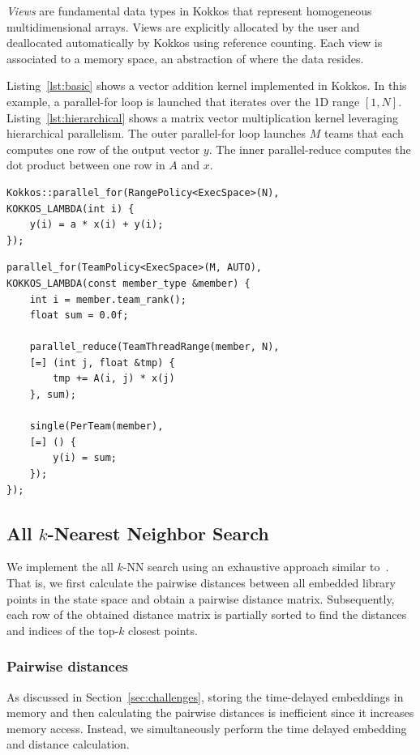 \documentclass{acmart}
\begin{document}
\textit{Views} are fundamental data types in Kokkos that represent
homogeneous multidimensional arrays. Views are explicitly allocated by the
user and deallocated automatically by Kokkos using reference counting. Each
view is associated to a memory space, an abstraction of where the data
resides.

Listing~\ref{lst:basic} shows a vector addition  kernel implemented in Kokkos.
In this example, a parallel-for loop is launched that iterates over the 1D
range $[1,N]$.
Listing~\ref{lst:hierarchical} shows a matrix vector multiplication kernel
leveraging hierarchical parallelism. The outer parallel-for loop launches $M$ teams
that each computes one row of the output vector $y$. The inner parallel-reduce
computes the dot product between one row in $A$ and $x$.

\begin{lstlisting}[caption={Basic data parallel loop},label={lst:basic},float]
Kokkos::parallel_for(RangePolicy<ExecSpace>(N),
KOKKOS_LAMBDA(int i) {
    y(i) = a * x(i) + y(i);
});
\end{lstlisting}

\begin{lstlisting}[caption={Hierarchical data parallel loop},label={lst:hierarchical},float]
parallel_for(TeamPolicy<ExecSpace>(M, AUTO),
KOKKOS_LAMBDA(const member_type &member) {
    int i = member.team_rank();
    float sum = 0.0f;

    parallel_reduce(TeamThreadRange(member, N),
    [=] (int j, float &tmp) {
        tmp += A(i, j) * x(j)
    }, sum);

    single(PerTeam(member),
    [=] () {
        y(i) = sum;
    });
});
\end{lstlisting}

\subsection{All \texorpdfstring{$k$}{k}-Nearest Neighbor Search}

We implement the all $k$-NN search using an exhaustive approach similar
to~\cite{Garcia2010}. That is, we first calculate the pairwise
distances between all embedded library points in the state space and obtain a
pairwise distance matrix. Subsequently, each row of the obtained distance
matrix is partially sorted to find the distances and indices of the top-$k$
closest points.

\subsubsection{Pairwise distances}
As discussed in Section~\ref{sec:challenges}, storing the time-delayed
embeddings in memory and then calculating the pairwise distances is
inefficient since it increases memory access. Instead, we simultaneously
perform the time delayed embedding and distance calculation.
\end{document}
